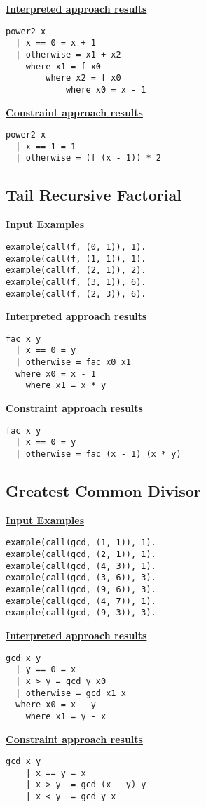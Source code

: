 \begin{multicols}{2}
\underline{\textbf{Interpreted approach results}}
\begin{lstlisting}
power2 x
  | x == 0 = x + 1
  | otherwise = x1 + x2
  	where x1 = f x0
  		where x2 = f x0
  			where x0 = x - 1
\end{lstlisting}
\columnbreak
\underline{\textbf{Constraint approach results}}
\begin{lstlisting}
power2 x
  | x == 1 = 1
  | otherwise = (f (x - 1)) * 2 
\end{lstlisting}
\end{multicols}
\pagebreak

\subsection{Tail Recursive Factorial}
\underline{\textbf{Input Examples}}
\begin{lstlisting}
example(call(f, (0, 1)), 1).
example(call(f, (1, 1)), 1).
example(call(f, (2, 1)), 2).
example(call(f, (3, 1)), 6).
example(call(f, (2, 3)), 6).
\end{lstlisting}

\begin{multicols}{2}
\underline{\textbf{Interpreted approach results}}

\begin{lstlisting}
fac x y
  | x == 0 = y
  | otherwise = fac x0 x1
  where x0 = x - 1
  	where x1 = x * y
\end{lstlisting}
\vspace*{\fill}
\columnbreak
\underline{\textbf{Constraint approach results}}
\begin{lstlisting}
fac x y
  | x == 0 = y
  | otherwise = fac (x - 1) (x * y)
\end{lstlisting}
\end{multicols}
\subsection{Greatest Common Divisor}
\underline{\textbf{Input Examples}}
\begin{lstlisting}
example(call(gcd, (1, 1)), 1).
example(call(gcd, (2, 1)), 1).
example(call(gcd, (4, 3)), 1).
example(call(gcd, (3, 6)), 3).
example(call(gcd, (9, 6)), 3).
example(call(gcd, (4, 7)), 1).
example(call(gcd, (9, 3)), 3).
\end{lstlisting}
\begin{multicols*}{2}
\underline{\textbf{Interpreted approach results}}
\begin{lstlisting}
gcd x y
  | y == 0 = x
  | x > y = gcd y x0
  | otherwise = gcd x1 x
  where x0 = x - y
  	where x1 = y - x
\end{lstlisting}
\vspace*{\fill}
\columnbreak
\underline{\textbf{Constraint approach results}}
\begin{lstlisting}
gcd x y
	| x == y = x
	| x > y	 = gcd (x - y) y
	| x < y	 = gcd y x
\end{lstlisting}
\end{multicols*}
\pagebreak

